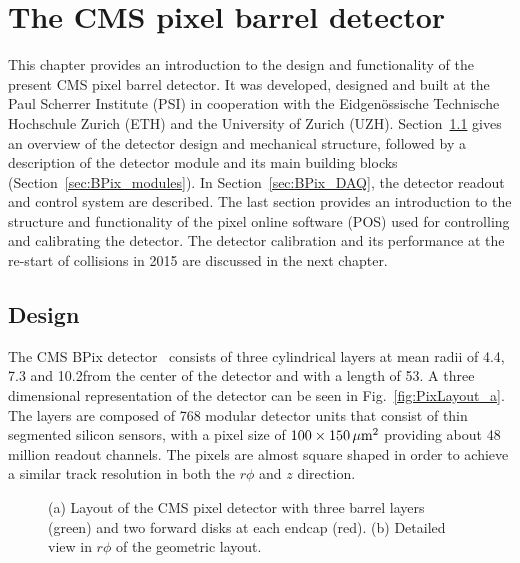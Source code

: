 \chapter{The CMS pixel barrel detector}
\label{ch:BPix}

This chapter provides an introduction to the design and functionality of the present CMS pixel barrel detector.
It was developed, designed and built at the Paul Scherrer Institute (PSI) in cooperation with the Eidgen{\"o}ssische Technische Hochschule Zurich (ETH) and the University of Zurich (UZH).
Section~\ref{sec:BPix_design} gives an overview of the detector design and mechanical structure, followed by a description of the detector module and its main building blocks (Section~\ref{sec:BPix_modules}).
In Section~\ref{sec:BPix_DAQ}, the detector readout and control system are described.
The last section provides an introduction to the structure and functionality of the pixel online software (POS) used for controlling and calibrating the detector.
The detector calibration and its performance at the re-start of collisions in 2015 are discussed in the next chapter.

\section{Design}\label{sec:BPix_design}

The CMS BPix detector~\cite{Kastli2007724} consists of three cylindrical layers at mean radii of 4.4, 7.3 and 10.2\cm from the center of the detector and with a length of 53\cm.
A three dimensional representation of the detector can be seen in Fig.~\ref{fig:PixLayout_a}.
The layers are composed of 768 modular detector units that consist of thin segmented silicon sensors, with a pixel size of $100\times150\,\mu\text{m}^2$ providing about 48 million readout channels.
The pixels are almost square shaped in order to achieve a similar track resolution in both the $r\phi$ and $z$ direction.

\begin{figure}[!htb]
 \begin{center}
 \end{center}
 \caption{(a) Layout of the CMS pixel detector with three barrel layers (green) and two forward disks at each endcap (red). (b) Detailed view in $r\phi$ of the geometric layout.}
 \label{fig:PixLayout}
\end{figure}

